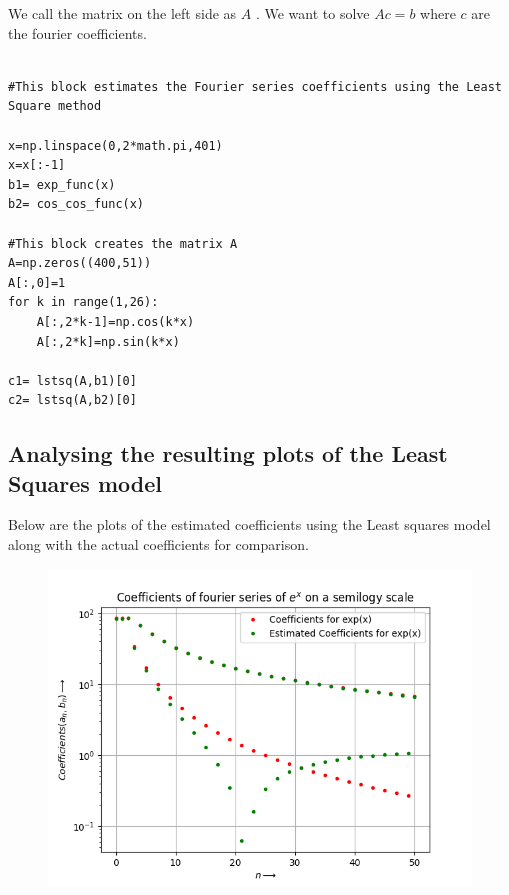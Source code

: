 \documentclass{article}
\begin{document}
We call the matrix on the left side as \(A\) . We want to
solve \(Ac=b\) where \(c\) are the fourier coefficients.

\begin{lstlisting}

#This block estimates the Fourier series coefficients using the Least Square method

x=np.linspace(0,2*math.pi,401)
x=x[:-1] 
b1= exp_func(x)
b2= cos_cos_func(x)

#This block creates the matrix A
A=np.zeros((400,51))
A[:,0]=1
for k in range(1,26):
    A[:,2*k-1]=np.cos(k*x) 
    A[:,2*k]=np.sin(k*x)

c1= lstsq(A,b1)[0]
c2= lstsq(A,b2)[0]

\end{lstlisting}

\subsection{Analysing the resulting plots of the Least Squares model}
Below are the plots of the estimated coefficients using the Least squares model along with the actual coefficients for comparison.\newline 
\begin{figure}[h!]
    \centering
    \includegraphics[scale=0.7]{estim_coeff1.png}
    \label{fig:1(b)}
\end{figure}
\end{document}
